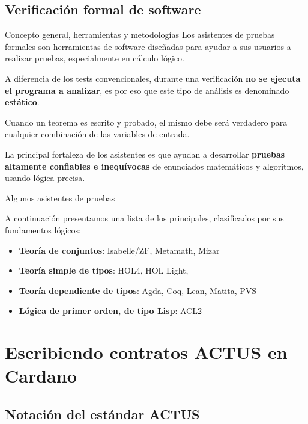 \documentclass{beamer}
\makeatletter
\let\HL\hl
\renewcommand\hl{%
  \let\set@color\beamerorig@set@color
  \let\reset@color\beamerorig@reset@color
  \HL}
\makeatother
\begin{document}
\subsection{Verificación formal de software}

\begin{frame}{Concepto general, herramientas y metodologías}
Los asistentes de pruebas formales son herramientas de software diseñadas para ayudar a sus usuarios a realizar pruebas, especialmente en cálculo lógico.

\vfill
\pause

A diferencia de los tests convencionales, durante una verificación \textbf{no se ejecuta el programa a analizar}, es por eso que este tipo de análisis es denominado \textbf{estático}.

\vfill

Cuando un teorema es escrito y probado, el mismo debe será verdadero para cualquier combinación de las variables de entrada.

\vfill
\pause

La principal fortaleza de los asistentes es que ayudan a desarrollar \textbf{pruebas altamente confiables e inequívocas} de enunciados matemáticos y algoritmos, usando lógica precisa.
\end{frame}

\begin{frame}{Algunos asistentes de pruebas}

A continuación presentamos una lista de los principales, clasificados por sus fundamentos lógicos:
\vfill
\pause

\begin{itemize}
    \item \textbf{Teoría de conjuntos}: Isabelle/ZF, Metamath, Mizar
    \item \textbf{Teoría simple de tipos}: HOL4, HOL Light, \only<3>{\hl{Isabelle/HOL}}
    \item \textbf{Teoría dependiente de tipos}: Agda, Coq, Lean, Matita, PVS
    \item \textbf{Lógica de primer orden, de tipo Lisp}: ACL2
\end{itemize}
\end{frame}

\section{Escribiendo contratos ACTUS en Cardano}

\subsection{Notación del estándar ACTUS}
\end{document}
